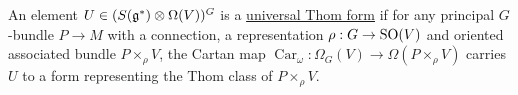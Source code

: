 \begin{defn} 
	An element $U\in (S(\operatorname{\mathfrak{g}}^*)\otimes \Omega(V))^G$ is a
	\underline{universal Thom form} if for any principal $G$-bundle $P\to M$ 
	with a connection, a representation $\rho : G\to \operatorname{SO}(V)$ and oriented
	associated bundle $P\times_\rho V$, the
	Cartan map $\operatorname{Car}_{\omega} : \Omega_{G}(V) \to
	\Omega(P\times_\rho V)$
	carries $U$ to a form representing the Thom class of $P\times_\rho V$.

\end{defn} 


